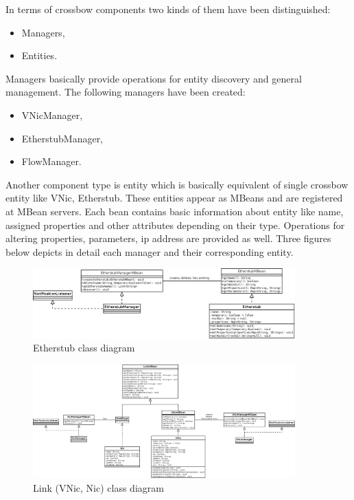 \documentclass[11pt]{book}
\begin{document}
      In terms of crossbow components two kinds of them have been distinguished:

      \begin{itemize}
        \item Managers,
        \item Entities.
      \end{itemize}

      Managers basically provide operations for entity discovery and general management. The following managers have
      been created:

      \begin{itemize}
        \item VNicManager,
        \item EtherstubManager,
        \item FlowManager.
      \end{itemize}

      Another component type is entity which is basically equivalent of single crossbow entity like VNic, Etherstub.
      These entities appear as MBeans and are registered at MBean servers. Each bean contains basic information about
      entity like name, assigned properties and other attributes depending on their type. Operations for altering
      properties, parameters, ip address are provided as well. Three figures below depicts in detail each manager and
      their corresponding entity.

        \begin{figure}[H]
          \begin{center}
            \includegraphics[width=0.9\textwidth]{img/impl/etherstub.png}
          \end{center}
          \caption{Etherstub class diagram}
        \end{figure}        

        \begin{figure}[H]
          \begin{center}
            \includegraphics[width=0.9\textwidth]{img/impl/link.png}
          \end{center}
          \caption{Link (VNic, Nic) class diagram}
        \end{figure}        
\end{document}
